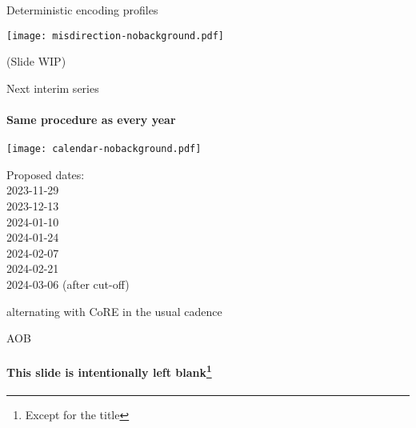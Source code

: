 \documentclass[aspectratio=169]{beamer}
\begin{document}
\begin{frame}{Deterministic encoding profiles}\large
    \begin{block}{\texttt{[image: misdirection-nobackground.pdf]}\mbox{\quad}}
    \end{block}
    (Slide WIP)
\end{frame}

\begin{frame}{Next interim series}\large
    \framesubtitle{Same procedure as every year}
    \begin{block}{\texttt{[image: calendar-nobackground.pdf]}\mbox{\quad}}
    \end{block}
    \vspace{-2cm}

    Proposed dates:\\
    2023-11-29\\
    2023-12-13\\
    2024-01-10\\
    2024-01-24\\
    2024-02-07\\
    2024-02-21\\
    2024-03-06 (after cut-off)

    \bigskip

    alternating with CoRE in the usual cadence
\end{frame}

\begin{frame}{AOB}\large
    \framesubtitle{This slide is intentionally left blank\footnote{Except for the title}}
\end{frame}
\end{document}
